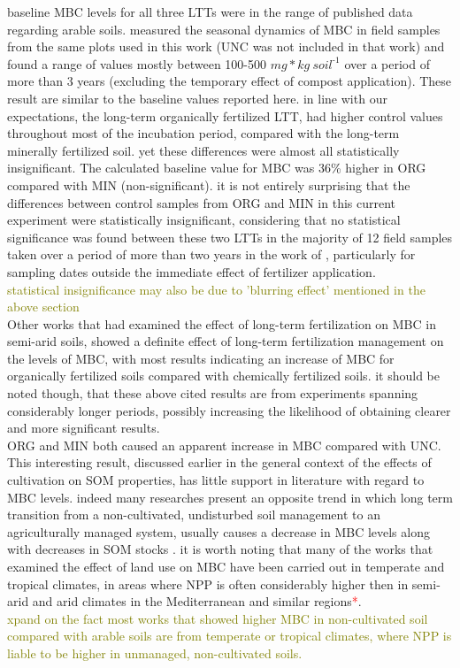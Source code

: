 \documentclass[12pt]{report}
\newcommand{\myRed}[1]{\textcolor{red}{#1}} %
\newcommand{\myGreen}[1]{\textcolor{olive}{#1}} %
\newlength{\SpaceAfterUnit}
\newcommand{\genericunit}{$ mg * kg\ soil^{\text{-}1}$ \hspace*{\SpaceAfterUnit}}
\begin{document}
			baseline MBC levels for all three LTTs were in the range of published data regarding arable soils\citep{gonzalez-quinones2011}. \citet{rotbart2018} measured the seasonal dynamics of MBC in field samples from the same plots used in this work (UNC was not included in that work) and found a range of values mostly between 100-500 \genericunit over a period of more than 3 years (excluding the temporary effect of compost application). These result are similar to the baseline values reported here.
			in line with our expectations, the long-term organically fertilized LTT, had higher control values throughout most of the incubation period, compared with the long-term minerally fertilized soil. yet these differences were almost all statistically insignificant. The calculated baseline value for MBC was 36\% higher in ORG compared with MIN (non-significant). it is not entirely surprising that the differences between control samples from ORG and MIN in this current experiment were statistically insignificant, considering that no statistical significance was found between these  two LTTs in the majority of 12 field samples taken over a period of more than two years in the work of \citet{rotbart2018}, particularly for sampling dates outside the immediate effect of fertilizer application.\\
			\myGreen{statistical insignificance may also be due to 'blurring effect' mentioned in the above section}\\
			Other works that had examined the effect of long-term fertilization on MBC in semi-arid soils, showed a definite effect of long-term fertilization management on the levels of MBC, with most results indicating an increase of MBC for organically fertilized soils compared with chemically fertilized soils\citep{luo2015, liu2013, ghoshal1995}. it should be noted though, that these above cited results are from experiments spanning considerably longer periods, possibly increasing the likelihood of obtaining clearer and more significant results.\\
			ORG and MIN both caused an apparent increase in MBC compared with UNC. This interesting result, discussed earlier in the general context of the effects of cultivation on SOM properties, has little support in literature with regard to MBC levels. indeed many researches present an opposite trend in which long term transition from a non-cultivated, undisturbed soil management to an agriculturally managed system, usually causes a decrease in MBC levels along with decreases in SOM stocks \citep{benbi2015, yu2013,zhou2018}. it is worth noting that many of the works that examined the effect of land use on MBC have been carried out in temperate and tropical climates, in areas where NPP is often considerably higher then in semi-arid and arid climates in the Mediterranean and similar regions\myRed{*}.\\
			\myGreen{xpand on the fact most works that showed higher MBC in non-cultivated soil compared with arable soils are from temperate or tropical climates, where NPP is liable to be higher in unmanaged, non-cultivated soils. }  
		
\end{document}
